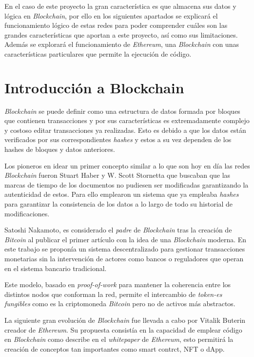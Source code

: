 
En el caso de este proyecto la gran característica es que almacena sus datos y lógica en \textit{Blockchain}, por ello en los siguientes apartados se explicará el funcionamiento lógico de estas redes para poder comprender cuáles son las grandes características que aportan a este proyecto, así como sus limitaciones. Además se explorará el funcionamiento de \textit{Ethereum}, una \textit{Blockchain} con unas características particulares que permite la ejecución de código.

\section{Introducción a Blockchain}

\textit{Blockchain} se puede definir como una estructura de datos formada por bloques que contienen transacciones y por sus características es extremadamente complejo y costoso editar transacciones ya realizadas. Esto es debido a que los datos están verificados por sus correspondientes \textit{hashes} y estos a su vez dependen de los hashes de bloques y datos anteriores.

Los pioneros en idear un primer concepto similar a lo que son hoy en día las redes \textit{Blockchain} fueron Stuart Haber y W. Scott Stornetta\cite{haber1991time} que buscaban que las marcas de tiempo de los documentos no pudiesen ser modificadas garantizando la autenticidad de estos. Para ello emplearon un sistema que ya empleaba \textit{hashes} para garantizar la consistencia de los datos a lo largo de todo su historial de modificaciones.

Satoshi Nakamoto, es considerado el \textit{padre} de \textit{Blockchain} tras la creación de \textit{Bitcoin} al publicar el primer artículo\cite{nakamoto2008bitcoin} con la idea de una \textit{Blockchain} moderna. En este trabajo se proponía un sistema descentralizado para gestionar transacciones monetarias sin la intervención de actores como bancos o reguladores que operan en el sistema bancario tradicional. 

Este modelo, basado en \textit{proof-of-work} para mantener la coherencia entre los distintos nodos que conforman la red, permite el intercambio de \textit{token-es fungibles} como es la criptomoneda \textit{Bitcoin} pero no de activos más abstractos. 

La siguiente gran evolución de \textit{Blockchain} fue llevada a cabo por Vitalik Buterin creador de \textit{Ethereum}. Su propuesta consistía en la capacidad de emplear código en \textit{Blockchain} como describe en el \textit{whitepaper} de \textit{Ethereum}\cite{buterin2014next}, esto permitirá la creación de conceptos tan importantes como smart contrct, NFT o dApp.

